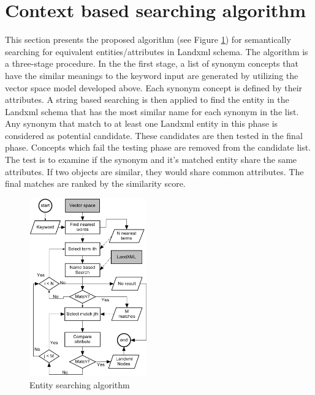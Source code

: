 \documentclass[Journal, InsideFigs, DoubleSpace]{ascelike} %
\begin{document}
\section{Context based searching algorithm} \label{sec:searching}
This section presents the proposed algorithm (see Figure \ref{fig:search_algorithm}) for semantically searching for equivalent entities/attributes in Landxml schema. The algorithm is a three-stage procedure. In the the first stage, a list of synonym concepts that have the similar meanings to the keyword input are generated by utilizing the vector space model developed above. Each synonym concept is defined by their attributes. A string based searching is then applied to find the entity in the Landxml schema that has the most similar name for each synonym in the list. Any synonym that match to at least one Landxml entity in this phase is considered as potential candidate. These candidates are then tested in the final phase. Concepts which fail the testing phase are removed from the candidate list. The test is to examine if the synonym and it's matched entity share the same attributes. If two objects are similar, they would share common attributes. The final matches are ranked by the similarity score. 



\begin{figure}[t]
\centering
\includegraphics[width=0.45\textwidth]{entity_search_algorithm}
\caption{Entity searching algorithm}
\label{fig:search_algorithm}
\end{figure}
\end{document}
